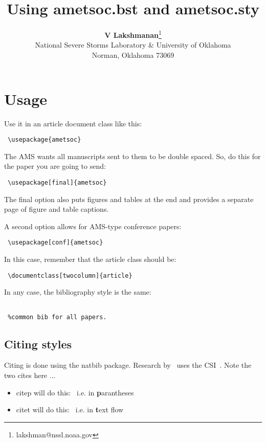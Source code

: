 \documentclass[twocolumn]{article}
\begin{document}
\title{\bf Using ametsoc.bst and ametsoc.sty}
\author{{\bf V Lakshmanan}\thanks{lakshman@nssl.noaa.gov}\\
National Severe Storms Laboratory \& University of Oklahoma \\
Norman, Oklahoma 73069 \\
}

\amstitle

\section{Usage}
Use it in an article document class like this:
\begin{verbatim} \usepackage{ametsoc} \end{verbatim}

The AMS wants all manuscripts sent to them to be double spaced. So, do this
for the paper you are going to send:
\begin{verbatim} \usepackage[final]{ametsoc} \end{verbatim}
The final option also puts figures and tables at the end and provides a
separate page of figure and table captions.

A second option allows for AMS-type conference papers:
\begin{verbatim} \usepackage[conf]{ametsoc} \end{verbatim}
In this case, remember that the article class should be:
\begin{verbatim} \documentclass[twocolumn]{article} \end{verbatim}

In any case, the bibliography style is the same:
\begin{verbatim}

 %common bib for all papers.
\end{verbatim}

\subsection{Citing styles}
Citing is done using the natbib package.
Research by~\citet{Doswell} uses the CSI~\citep{csi}.
Note the two cites here ...
\begin{itemize}
\item citep will do this:~\citep{csi} i.e. in {\bf p}arantheses
\item citet will do this:~\citet{Doswell} i.e. in {\bf t}ext flow
\end{itemize}
\end{document}
